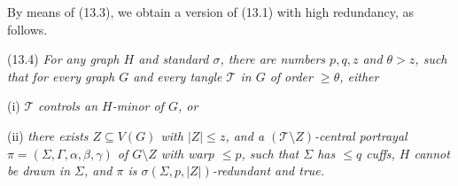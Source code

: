 By means of (13.3), we obtain a version of (13.1) with high redundancy, as follows.

\stmt
(13.4) \textit{For any graph $H$ and standard $\sigma$, there are numbers $p, q, z$ and $\theta > z$, such that for every graph $G$ and every tangle $\mathscr{T}$ in $G$ of order $\ge \theta$, either}

\hspace*{12pt}(i) $\mathscr{T}$ \textit{controls an $H$-minor of $G$, or}

\hspace*{12pt}(ii) \textit{there exists $Z \subseteq V(G)$ with $|Z| \le z$, and a $(\mathscr{T} \setminus Z)$-central portrayal $\pi = (\Sigma, \Gamma, \alpha, \beta, \gamma)$ of $G \setminus Z$ with warp $\le p$, such that $\Sigma$ has $\le q$ cuffs, $H$ cannot be drawn in $\Sigma$, and $\pi$ is $\sigma(\Sigma, p, |Z|)$-redundant and true.}
